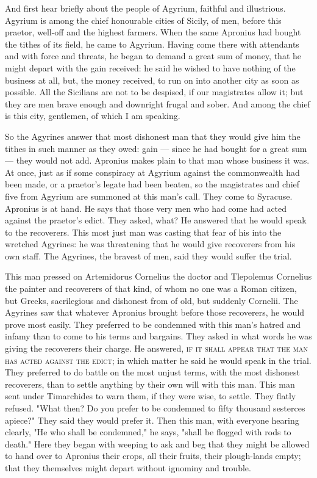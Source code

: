  And first hear briefly about the people of Agyrium, faithful and illustrious. Agyrium is among the chief honourable cities of Sicily, of men, before this praetor, well-off and the highest farmers. When the same Apronius had bought the tithes of its field, he came to Agyrium. Having come there with attendants and with force and threats, he began to demand a great sum of money, that he might depart with the gain received: he said he wished to have nothing of the business at all, but, the money received, to run on into another city as soon as possible. All the Sicilians are not to be despised, if our magistrates allow it; but they are men brave enough and downright frugal and sober. And among the chief is this city, gentlemen, of which I am speaking.

 So the Agyrines answer that most dishonest man that they would give him the tithes in such manner as they owed: gain --- since he had bought for a great sum --- they would not add. Apronius makes plain to that man whose business it was. At once, just as if some conspiracy at Agyrium against the commonwealth had been made, or a praetor's legate had been beaten, so the magistrates and chief five from Agyrium are summoned at this man's call. They come to Syracuse. Apronius is at hand. He says that those very men who had come had acted against the praetor's edict. They asked, what? He answered that he would speak to the recoverers. This most just man was casting that fear of his into the wretched Agyrines: he was threatening that he would give recoverers from his own staff. The Agyrines, the bravest of men, said they would suffer the trial.

 This man pressed on Artemidorus Cornelius the doctor and Tlepolemus Cornelius the painter and recoverers of that kind, of whom no one was a Roman citizen, but Greeks, sacrilegious and dishonest from of old, but suddenly Cornelii. The Agyrines saw that whatever Apronius brought before those recoverers, he would prove most easily. They preferred to be condemned with this man's hatred and infamy than to come to his terms and bargains. They asked in what words he was giving the recoverers their charge. He answered, \textsc{if it shall appear that the man has acted against the edict}; in which matter he said he would speak in the trial. They preferred to do battle on the most unjust terms, with the most dishonest recoverers, than to settle anything by their own will with this man. This man sent under Timarchides to warn them, if they were wise, to settle. They flatly refused. "What then? Do you prefer to be condemned to fifty thousand sesterces apiece?" They said they would prefer it. Then this man, with everyone hearing clearly, "He who shall be condemned," he says, "shall be flogged with rods to death." Here they began with weeping to ask and beg that they might be allowed to hand over to Apronius their crops, all their fruits, their plough-lands empty; that they themselves might depart without ignominy and trouble.

